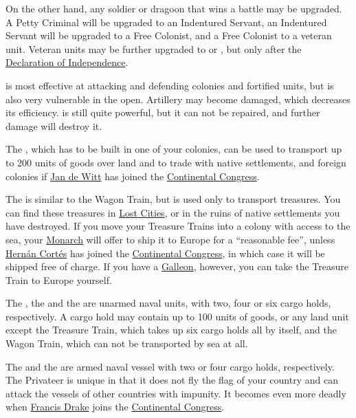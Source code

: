 \documentclass[12pt]{article}
\begin{document}
On the other hand, any soldier or dragoon that wins a battle may be
upgraded. A Petty Criminal will be upgraded to an Indentured Servant,
an Indentured Servant will be upgraded to a Free Colonist, and a Free
Colonist to a veteran unit. Veteran units may be further upgraded to
 or , but only after the
\hyperlink{Declaration of Independence}{Declaration of Independence}.

 is most effective at attacking and defending colonies
and fortified units, but is also very vulnerable in the
open. Artillery may become damaged, which decreases its
efficiency.  is still quite powerful, but it
can not be repaired, and further damage will destroy it.

The , which has to be built in one of your colonies,
can be used to transport up to 200 units of goods over land and to
trade with native settlements, and foreign colonies if \hyperlink{Jan
de Witt}{Jan de Witt} has joined the \hyperlink{Continental
Congress}{Continental Congress}.

The  is similar to the Wagon Train, but is used
only to transport treasures. You can find these treasures in
\hyperlink{Lost City Rumours}{Lost Cities}, or in the ruins of native
settlements you have destroyed. If you move your Treasure Trains into
a colony with access to the sea, your \hyperlink{Monarch}{Monarch}
will offer to ship it to Europe for a ``reasonable fee'', unless
\hyperlink{Hernan Cortes}{Hern\'an Cort\'es} has joined the
\hyperlink{Continental Congress}{Continental Congress}, in which case
it will be shipped free of charge. If you have a
\hyperlink{Galleon}{Galleon}, however, you can take the Treasure Train
to Europe yourself.

The , the  and the  are
unarmed \hypertarget{Naval Units}{naval units}, with two, four or six
cargo holds, respectively. A cargo hold may contain up to 100 units of
goods, or any land unit except the Treasure Train, which takes up six
cargo holds all by itself, and the Wagon Train, which can not be
transported by sea at all.

The  and the  are armed naval vessel
with two or four cargo holds, respectively. The Privateer is unique in
that it does not fly the flag of your country and can attack the
vessels of other countries with impunity. It becomes even more deadly
when \hyperlink{Francis Drake}{Francis Drake} joins the
\hyperlink{Continental Congress}{Continental Congress}.
\end{document}
